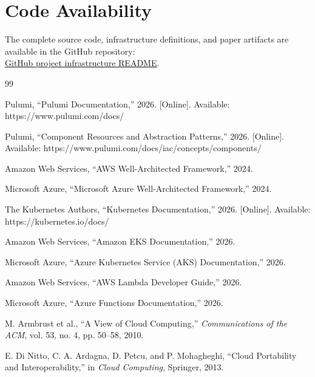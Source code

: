 \documentclass[conference]{IEEEtran}
\begin{document}
\section*{Code Availability}
The complete source code, infrastructure definitions, and paper artifacts are available in the GitHub repository:\\
\href{https://github.com/ndinevski/puppeteer-renderer-performance-comparison/blob/master/infrastructure/README.md}{\underline{GitHub project infrastructure README}}.

\begin{thebibliography}{99}

Pulumi, ``Pulumi Documentation,'' 2026. [Online]. Available: https://www.pulumi.com/docs/

Pulumi, ``Component Resources and Abstraction Patterns,'' 2026. [Online]. Available: https://www.pulumi.com/docs/iac/concepts/components/

Amazon Web Services, ``AWS Well-Architected Framework,'' 2024.

Microsoft Azure, ``Microsoft Azure Well-Architected Framework,'' 2024.

The Kubernetes Authors, ``Kubernetes Documentation,'' 2026. [Online]. Available: https://kubernetes.io/docs/

Amazon Web Services, ``Amazon EKS Documentation,'' 2026.

Microsoft Azure, ``Azure Kubernetes Service (AKS) Documentation,'' 2026.

Amazon Web Services, ``AWS Lambda Developer Guide,'' 2026.

Microsoft Azure, ``Azure Functions Documentation,'' 2026.

M. Armbrust et al., ``A View of Cloud Computing,'' \textit{Communications of the ACM}, vol. 53, no. 4, pp. 50--58, 2010.

E. Di Nitto, C. A. Ardagna, D. Petcu, and P. Mohagheghi, ``Cloud Portability and Interoperability,'' in \textit{Cloud Computing}, Springer, 2013.

\end{thebibliography}
\end{document}
